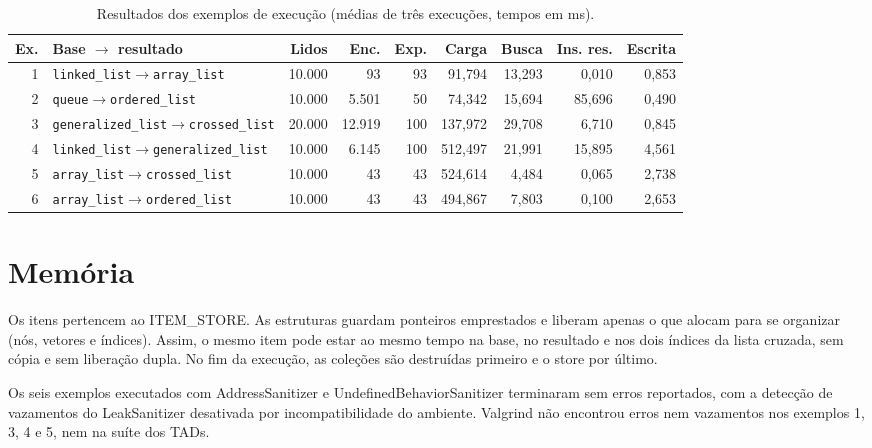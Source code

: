 \documentclass[11pt,a4paper]{article}
\newcommand{\cab}[1]{\rowcolor{gray!22}#1}
\begin{document}
\begin{table}[!htbp]
\centering
\caption{Resultados dos exemplos de execução (médias de três execuções, tempos em ms).}
\footnotesize
\setlength{\tabcolsep}{4pt}
\begin{tabular}{@{}r p{4.3cm} r r r r r r r@{}}
\toprule
\cab{\textbf{Ex.} & \textbf{Base $\rightarrow$ resultado} & \textbf{Lidos} & \textbf{Enc.} & \textbf{Exp.} & \textbf{Carga} & \textbf{Busca} & \textbf{Ins. res.} & \textbf{Escrita}} \\
\midrule
1 & \texttt{linked\_\allowbreak{}list}$\rightarrow$\texttt{array\_\allowbreak{}list} & 10.000 & 93 & 93 & 91,794 & 13,293 & 0,010 & 0,853 \\
2 & \texttt{queue}$\rightarrow$\texttt{ordered\_\allowbreak{}list} & 10.000 & 5.501 & 50 & 74,342 & 15,694 & 85,696 & 0,490 \\
3 & \texttt{generalized\_\allowbreak{}list}$\rightarrow$\texttt{crossed\_\allowbreak{}list} & 20.000 & 12.919 & 100 & 137,972 & 29,708 & 6,710 & 0,845 \\
4 & \texttt{linked\_\allowbreak{}list}$\rightarrow$\texttt{generalized\_\allowbreak{}list} & 10.000 & 6.145 & 100 & 512,497 & 21,991 & 15,895 & 4,561 \\
5 & \texttt{array\_\allowbreak{}list}$\rightarrow$\texttt{crossed\_\allowbreak{}list} & 10.000 & 43 & 43 & 524,614 & 4,484 & 0,065 & 2,738 \\
6 & \texttt{array\_\allowbreak{}list}$\rightarrow$\texttt{ordered\_\allowbreak{}list} & 10.000 & 43 & 43 & 494,867 & 7,803 & 0,100 & 2,653 \\
\bottomrule
\end{tabular}
\end{table}

\section{Memória}

Os itens pertencem ao ITEM\_STORE. As estruturas guardam ponteiros emprestados e liberam apenas o que alocam para se organizar (nós, vetores e índices). Assim, o mesmo item pode estar ao mesmo tempo na base, no resultado e nos dois índices da lista cruzada, sem cópia e sem liberação dupla. No fim da execução, as coleções são destruídas primeiro e o store por último.

Os seis exemplos executados com AddressSanitizer e UndefinedBehaviorSanitizer terminaram sem erros reportados, com a detecção de vazamentos do LeakSanitizer desativada por incompatibilidade do ambiente. Valgrind não encontrou erros nem vazamentos nos exemplos 1, 3, 4 e 5, nem na suíte dos TADs.
\end{document}
